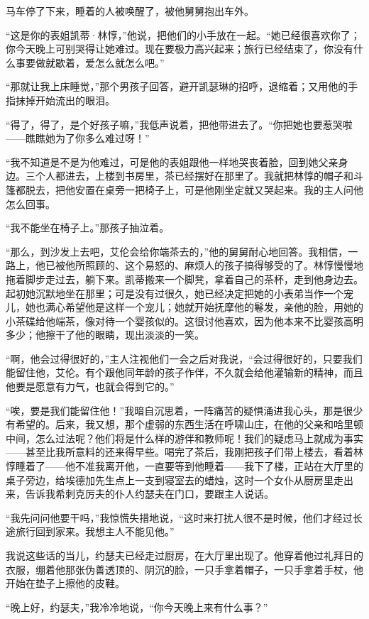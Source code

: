 \par 马车停了下来，睡着的人被唤醒了，被他舅舅抱出车外。
\par “这是你的表姐凯蒂·林惇，”他说，把他们的小手放在一起。“她已经很喜欢你了；你今天晚上可别哭得让她难过。现在要极力高兴起来；旅行已经结束了，你没有什么事要做就歇着，爱怎么就怎么吧。”
\par “那就让我上床睡觉，”那个男孩子回答，避开凯瑟琳的招呼，退缩着；又用他的手指抹掉开始流出的眼泪。
\par “得了，得了，是个好孩子嘛，”我低声说着，把他带进去了。“你把她也要惹哭啦——瞧瞧她为了你多么难过呀！”
\par “我不知道是不是为他难过，可是他的表姐跟他一样地哭丧着脸，回到她父亲身边。三个人都进去，上楼到书房里，茶已经摆好在那里了。我就把林惇的帽子和斗篷都脱去，把他安置在桌旁一把椅子上，可是他刚坐定就又哭起来。我的主人问他怎么回事。
\par “我不能坐在椅子上。”那孩子抽泣着。
\par “那么，到沙发上去吧，艾伦会给你端茶去的，”他的舅舅耐心地回答。我相信，一路上，他已被他所照顾的、这个易怒的、麻烦人的孩子搞得够受的了。林惇慢慢地拖着脚步走过去，躺下来。凯蒂搬来一个脚凳，拿着自己的茶杯，走到他身边去。起初她沉默地坐在那里；可是没有过很久，她已经决定把她的小表弟当作一个宠儿，她也满心希望他是这样一个宠儿；她就开始抚摩他的鬈发，亲他的脸，用她的小茶碟给他端茶，像对待一个婴孩似的。这很讨他喜欢，因为他本来不比婴孩高明多少；他擦干了他的眼睛，现出淡淡的一笑。
\par “啊，他会过得很好的，”主人注视他们一会之后对我说，“会过得很好的，只要我们能留住他，艾伦。有个跟他同年龄的孩子作伴，不久就会给他灌输新的精神，而且他要是愿意有力气，也就会得到它的。”
\par “唉，要是我们能留住他！”我暗自沉思着，一阵痛苦的疑惧涌进我心头，那是很少有希望的。后来，我又想，那个虚弱的东西生活在呼啸山庄，在他的父亲和哈里顿中间，怎么过法呢？他们将是什么样的游伴和教师呢！我们的疑虑马上就成为事实——甚至比我所意料的还来得早些。喝完了茶后，我刚把孩子们带上楼去，看着林惇睡着了——他不准我离开他，一直要等到他睡着——我下了楼，正站在大厅里的桌子旁边，给埃德加先生点上一支到寝室去的蜡烛，这时一个女仆从厨房里走出来，告诉我希刺克厉夫的仆人约瑟夫在门口，要跟主人说话。
\par “我先问问他要干吗，”我惊慌失措地说，“这时来打扰人很不是时候，他们才经过长途旅行回到家来。我想主人不能见他。”
\par 我说这些话的当儿，约瑟夫已经走过厨房，在大厅里出现了。他穿着他过礼拜日的衣服，绷着他那张伪善透顶的、阴沉的脸，一只手拿着帽子，一只手拿着手杖，他开始在垫子上擦他的皮鞋。
\par “晚上好，约瑟夫，”我冷冷地说，“你今天晚上来有什么事？”
